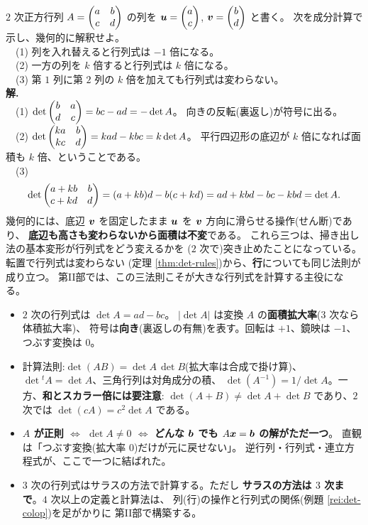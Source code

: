 \begin{rei}[例題・標準(証明:列の操作と行列式)]\label{rei:det-colop}
$2$ 次正方行列 $A = \begin{pmatrix}a & b \\ c & d\end{pmatrix}$ の列を
$\bm{u} = \begin{pmatrix}a \\ c\end{pmatrix}$, $\bm{v} = \begin{pmatrix}b \\ d\end{pmatrix}$ と書く。
次を成分計算で示し、幾何的に解釈せよ。\\
　(1) 列を入れ替えると行列式は $-1$ 倍になる。\\
　(2) 一方の列を $k$ 倍すると行列式は $k$ 倍になる。\\
　(3) 第 $1$ 列に第 $2$ 列の $k$ 倍を加えても行列式は変わらない。\\
\textbf{解.}\\
　(1) $\det \begin{pmatrix}b & a \\ d & c\end{pmatrix} = bc - ad = -\det A$。
向きの反転(裏返し)が符号に出る。\\
　(2) $\det \begin{pmatrix}ka & b \\ kc & d\end{pmatrix} = kad - kbc = k \det A$。
平行四辺形の底辺が $k$ 倍になれば面積も $k$ 倍、ということである。\\
　(3)
\[
\det \begin{pmatrix}a + kb & b \\ c + kd & d\end{pmatrix} = (a + kb)d - b(c + kd)
= ad + kbd - bc - kbd = \det A.
\]
幾何的には、底辺 $\bm{v}$ を固定したまま $\bm{u}$ を
$\bm{v}$ 方向に滑らせる操作(せん断)であり、
\textbf{底辺も高さも変わらないから面積は不変}である。
これら三つは、掃き出し法の基本変形が行列式をどう変えるかを
($2$ 次で)突き止めたことになっている。転置で行列式は変わらない
(定理 \ref{thm:det-rules})から、\textbf{行}についても同じ法則が成り立つ。
第II部では、この三法則こそが大きな行列式を計算する主役になる。
\end{rei}

\begin{matome}
\begin{itemize}
\item $2$ 次の行列式は $\det A = ad - bc$。
$|\det A|$ は変換 $A$ の\textbf{面積拡大率}($3$ 次なら体積拡大率)、
符号は\textbf{向き}(裏返しの有無)を表す。回転は $+1$、鏡映は $-1$、
つぶす変換は $0$。
\item 計算法則:$\det(AB) = \det A \, \det B$(拡大率は合成で掛け算)、
$\det {}^t\!A = \det A$、三角行列は対角成分の積、
$\det(A^{-1}) = 1/\det A$。一方、\textbf{和とスカラー倍には要注意}:
$\det(A + B) \neq \det A + \det B$ であり、$2$ 次では
$\det(cA) = c^2 \det A$ である。
\item \textbf{$A$ が正則 $\iff$ $\det A \neq 0$ $\iff$
どんな $\bm{b}$ でも $A\bm{x} = \bm{b}$ の解がただ一つ}。
直観は「つぶす変換(拡大率 $0$)だけが元に戻せない」。
逆行列・行列式・連立方程式が、ここで一つに結ばれた。
\item $3$ 次の行列式はサラスの方法で計算する。ただし
\textbf{サラスの方法は $3$ 次まで}。$4$ 次以上の定義と計算法は、
列(行)の操作と行列式の関係(例題 \ref{rei:det-colop})を足がかりに
第II部で構築する。
\end{itemize}
\end{matome}

